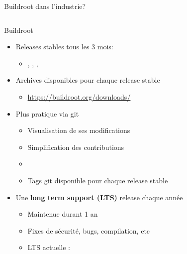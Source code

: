 \begin{frame}{Buildroot dans l'industrie?}
\begin{columns}
  \end{columns}
\end{frame}

\begin{frame}{Buildroot}
  \begin{itemize}
  \item Releases stables tous les 3 mois:
    \begin{itemize}
    \item {}, , ,
    \end{itemize}
  \item Archives disponibles pour chaque release stable
    \begin{itemize}
    \item \url{https://buildroot.org/downloads/}
    \end{itemize}
  \item Plus pratique via git
    \begin{itemize}
    \item Visualisation de ses modifications
    \item Simplification des contributions
    \item {}
    \item Tags git disponible pour chaque release stable
    \end{itemize}
  \item Une {\bf long term support (LTS)} release chaque année
    \begin{itemize}
    \item Maintenue durant 1 an
    \item Fixes de sécurité, bugs, compilation, etc
    \item LTS actuelle : 
    \end{itemize}
  \end{itemize}
\end{frame}

